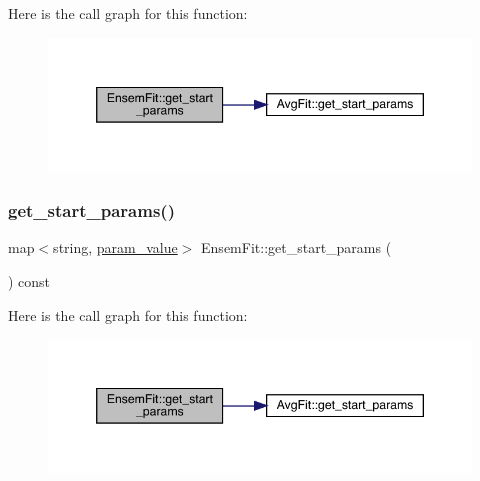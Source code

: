 Here is the call graph for this function\+:
\nopagebreak
\begin{figure}[H]
\begin{center}
\leavevmode
\includegraphics[width=346pt]{dc/dae/classEnsemFit_a24424685749c260b1db4e63e34de74ae_cgraph}
\end{center}
\end{figure}
\mbox{\label{classEnsemFit_a24424685749c260b1db4e63e34de74ae}} 
\subsubsection{\texorpdfstring{get\_start\_params()}{get\_start\_params()}\hspace{0.1cm}{\footnotesize\ttfamily [2/2]}}
{\footnotesize\ttfamily map$<$string, \mbox{\hyperlink{structparam__value}{param\+\_\+value}}$>$ Ensem\+Fit\+::get\+\_\+start\+\_\+params (\begin{DoxyParamCaption}{ }\end{DoxyParamCaption}) const\hspace{0.3cm}{\ttfamily [inline]}}

Here is the call graph for this function\+:
\nopagebreak
\begin{figure}[H]
\begin{center}
\leavevmode
\includegraphics[width=346pt]{dc/dae/classEnsemFit_a24424685749c260b1db4e63e34de74ae_cgraph}
\end{center}
\end{figure}
\mbox{\label{classEnsemFit_a1abab16ecba6b2a75d6d570585d35e9a}} 
